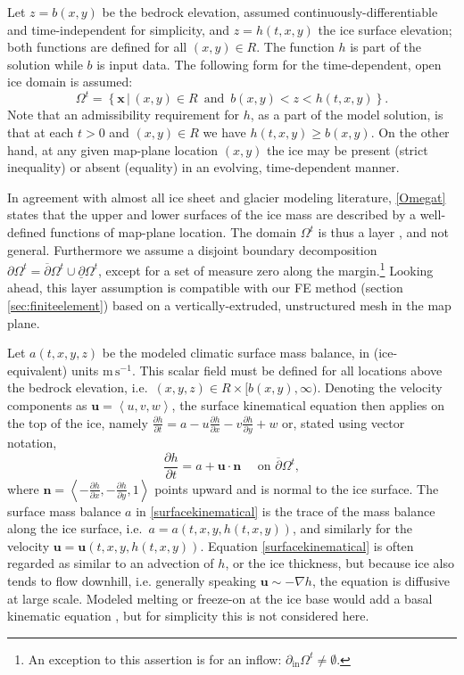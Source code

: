 \documentclass[letterpaper,final,12pt,reqno]{amsart}
\newcommand{\grad}{\nabla}
\newcommand{\bn}{\mathbf{n}}
\newcommand{\bu}{\mathbf{u}}
\newcommand{\bx}{\mathbf{x}}
\begin{document}
Let $z=b(x,y)$ be the bedrock elevation, assumed continuously-differentiable and time-independent for simplicity, and $z=h(t,x,y)$ the ice surface elevation; both functions are defined for all $(x,y)\in R$.  The function $h$ is part of the solution while $b$ is input data.  The following form for the time-dependent, open ice domain is assumed:
\begin{equation}
\Omega^t = \left\{\bx\,\big|\,(x,y)\in R \,\text{ and }\, b(x,y) < z < h(t,x,y)\right\}.  \label{Omegat}
\end{equation}
Note that an admissibility requirement for $h$, as a part of the model solution, is that at each $t>0$ and $(x,y)\in R$ we have $h(t,x,y) \ge b(x,y)$.  On the other hand, at any given map-plane location $(x,y)$ the ice may be present (strict inequality) or absent (equality) in an evolving, time-dependent manner.

In agreement with almost all ice sheet and glacier modeling literature, \eqref{Omegat} states that the upper and lower surfaces of the ice mass are described by a well-defined functions of map-plane location.  The domain $\Omega^t$ is thus a layer \cite{Bueler2020}, and not general.  Furthermore we assume a disjoint boundary decomposition $\partial \Omega^t = \overline{\partial} \Omega^t \cup \underline{\partial} \Omega^t$, except for a set of measure zero along the margin.\footnote{An exception to this assertion is for an inflow: $\partial_{\text{in}} \Omega^t \ne \emptyset$.}  Looking ahead, this layer assumption is compatible with our FE method (section \ref{sec:finiteelement}) based on a vertically-extruded, unstructured mesh in the map plane.

Let $a(t,x,y,z)$ be the modeled climatic surface mass balance, in (ice-equivalent) units $\text{m}\,\text{s}^{-1}$.  This scalar field must be defined for all locations above the bedrock elevation, i.e.~$(x,y,z) \in R\times[b(x,y),\infty)$.  Denoting the velocity components as $\bu=\left<u,v,w\right>$, the surface kinematical equation \cite{GreveBlatter2009} then applies on the top of the ice, namely $\frac{\partial h}{\partial t} = a - u \frac{\partial h}{\partial x} - v \frac{\partial h}{\partial y} + w$ or, stated using vector notation,
\begin{equation}
\frac{\partial h}{\partial t} = a + \bu \cdot \bn \quad \text{ on } \overline{\partial}\Omega^t, \label{surfacekinematical}
\end{equation}
where $\bn = \left<-\frac{\partial h}{\partial x},-\frac{\partial h}{\partial y},1\right>$ points upward and is normal to the ice surface.  The surface mass balance $a$ in \eqref{surfacekinematical} is the trace \cite{Evans2010} of the mass balance along the ice surface, i.e.~$a = a(t,x,y,h(t,x,y))$, and similarly for the velocity $\bu = \bu(t,x,y,h(t,x,y))$.  Equation \eqref{surfacekinematical} is often regarded as similar to an advection of $h$, or the ice thickness, but because ice also tends to flow downhill, i.e. generally speaking $\bu \sim -\grad h$, the equation is diffusive at large scale.  Modeled melting or freeze-on at the ice base would add a basal kinematic equation \cite[for example]{Aschwandenetal2012}, but for simplicity this is not considered here.
\end{document}
